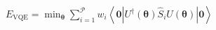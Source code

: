 \documentclass[preview]{standalone}
\begin{document}
\begin{center}
$E_\text{VQE} = \min_{\boldsymbol{\theta}} \sum_{i = 1}^\mathcal{P}w_i\left<\mathbf{0}|U^\dagger(\boldsymbol{\theta})\hat{S}_iU(\boldsymbol{\theta})|\mathbf{0}\right>$
\end{center}
\end{document}
